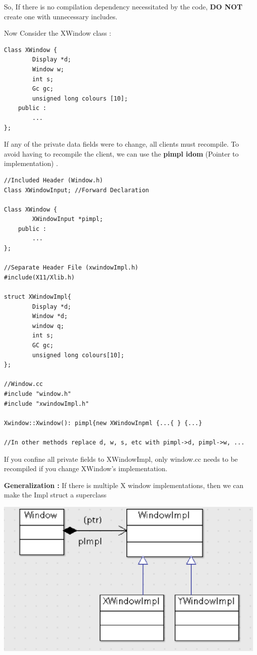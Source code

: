 \documentclass{article}
\begin{document}
So, If there is no compilation dependency necessitated by the code, \textbf{DO NOT} create one with unnecessary includes. 

Now Consider the XWindow class : 
\begin{lstlisting}
Class XWindow {
		Display *d;
		Window w;
		int s;
		Gc gc;
		unsigned long colours [10];
	public :
		...
};
\end{lstlisting}

If any of the private data fields were to change, all clients must recompile. To  avoid having to recompile the client, we can use the \textbf{pimpl idom} (Pointer to implementation) .

\begin{lstlisting}
//Included Header (Window.h)
Class XWindowInput; //Forward Declaration

Class XWindow {
		XWindowInput *pimpl;
	public :
		...
};

//Separate Header File (xwindowImpl.h)
#include(X11/Xlib.h)

struct XWindowImpl{
		Display *d;
		Window *d;
		window q;
		int s;
		GC gc;
		unsigned long colours[10];
};

//Window.cc
#include "window.h"
#include "xwindowImpl.h"

Xwindow::Xwindow(): pimpl{new XWindowInpml {...{ } {...} 

//In other methods replace d, w, s, etc with pimpl->d, pimpl->w, ...
\end{lstlisting}

If you confine all private fields to XWindowImpl, only window.cc needs to be recompiled if you change XWindow's implementation. 

\textbf{Generalization :} If there is multiple X window implementations, then we can make the Impl struct a superclass

\begin{center}
\includegraphics[scale=0.8]{lec10-2}
\end{center}
\end{document}
